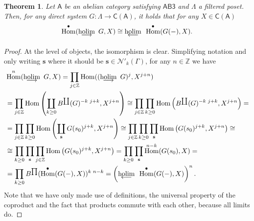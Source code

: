 \documentclass[reqno,11pt]{amsart}
\theoremstyle{plain}
\newtheorem{thm}{Theorem}[section]
\theoremstyle{remark}
\theoremstyle{definition}
\numberwithin{equation}{thm}
\newcommand{\CN}{\mathcal{N}}
\newcommand{\SA}{\mathsf{A}}
\newcommand{\CCC}{\boldsymbol{\mathsf{C}}}
\newcommand{\ZZ}{\mathbb{Z}}
\newcommand{\holim}[1]{\begin{array}[t]{c} {\rm holim}\\[-7.5 pt]
		{\longleftarrow} \end{array}}
\newcommand{\hocolim}[1]{\begin{array}[t]{c} {\rm holim}\\[-7.5 pt]
		{\longrightarrow} \end{array}}
\DeclareMathOperator{\Hom}{Hom}
\begin{document}
	\begin{thm}\label{hom-and-hocolim-holim}
		Let $\SA$ be an abelian category satisfying $\mathsf{AB3}$ and $\Lambda$ a filtered poset. Then, for any direct system $G \colon \Lambda \to \CCC(\SA)$, it holds that for any $X \in \CCC(\SA)$
		\[
			\Hom^\bullet(\!\!\!\hocolim{}G, X) \cong \!\!\!\holim{} \Hom^\bullet(G(-), X).
		\]
	\end{thm}
	\begin{proof}
		
		At the level of objects, the isomorphism is clear. Simplifying notation and only writing $\textbf{s}$ where it should be $\textbf{s} \in \CN'_k(\Gamma)$, for any $n \in \ZZ$ we have
		\begin{equation*}
			\begin{aligned}
				&\Hom^n(\!\!\!\hocolim{}G, X) = \prod_{j \in \ZZ} \Hom((\!\!\!\hocolim{}G)^j, X^{j+n}) \\
				&= \prod_{j \in \ZZ} \Hom\left(\coprod_{k \geq 0}B^{\coprod}(G)^{-k \,\, j+k}, X^{j+n}\right) \cong \prod_{j \in \ZZ} \prod_{k \geq 0} \Hom\left(B^{\coprod}(G)^{-k \,\, j+k}, X^{j+n}\right) = \\
				&=\prod_{j \in \ZZ} \prod_{k \geq 0} \Hom\left(\coprod_{\textbf{s}}G(s_0)^{j+k}, X^{j+n}\right) \cong \prod_{j \in \ZZ} \prod_{k \geq 0} \prod_{\textbf{s}}	\Hom\left(G(s_0)^{j+k}, X^{j+n}\right)	\cong \\
				&\cong \prod_{k \geq 0} \prod_{\textbf{s}} \prod_{j \in \ZZ} \Hom\left(G(s_0)^{j+k}, X^{j+n}\right) = \prod_{k \geq 0} \prod_{\textbf{s}} \Hom^{n-k}(G(s_0), X) = \\
				&= \prod_{k \geq 0} B^{\prod}(\Hom^\bullet(G(-), X))^{k \, \, n-k} = \left(\!\!\!\holim{} \Hom^\bullet(G(-),X)\right)^n.
			\end{aligned}
		\end{equation*}
		Note that we have only made use of definitions, the universal property of the coproduct and the fact that products commute with each other, because all limits do.
		

\end{proof}
\end{document}
